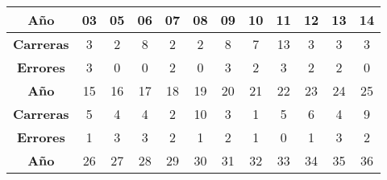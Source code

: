 \begin{table}[h!]
    \centering
    \begin{tabular}{cccccccccccc}
        \hline
        \multicolumn{1}{|c|}{\textbf{Año}} & \multicolumn{1}{c|}{03} & \multicolumn{1}{c|}{05} & \multicolumn{1}{c|}{06} & \multicolumn{1}{c|}{07} & \multicolumn{1}{c|}{08} & \multicolumn{1}{c|}{09} & \multicolumn{1}{c|}{10} & \multicolumn{1}{c|}{11} & \multicolumn{1}{c|}{12} & \multicolumn{1}{c|}{13} & \multicolumn{1}{c|}{14} \\ \hline
        \textbf{Carreras}                  & 3                       & 2                       & 8                       & 2                       & 2                       & 8                       & 7                       & 13                      & 3                       & 3                       & 3                       \\
        \textbf{Errores}                   & 3                       & 0                       & 0                       & 2                       & 0                       & 3                       & 2                       & 3                       & 2                       & 2                       & 0                       \\ \hline
        \multicolumn{1}{|c|}{\textbf{Año}} & \multicolumn{1}{c|}{15} & \multicolumn{1}{c|}{16} & \multicolumn{1}{c|}{17} & \multicolumn{1}{c|}{18} & \multicolumn{1}{c|}{19} & \multicolumn{1}{c|}{20} & \multicolumn{1}{c|}{21} & \multicolumn{1}{c|}{22} & \multicolumn{1}{c|}{23} & \multicolumn{1}{c|}{24} & \multicolumn{1}{c|}{25} \\ \hline
        \textbf{Carreras}                  & 5                       & 4                       & 4                       & 2                       & 10                      & 3                       & 1                       & 5                       & 6                       & 4                       & 9                       \\
        \textbf{Errores}                   & 1                       & 3                       & 3                       & 2                       & 1                       & 2                       & 1                       & 0                       & 1                       & 3                       & 2                       \\ \hline
        \multicolumn{1}{|c|}{\textbf{Año}} & \multicolumn{1}{c|}{26} & \multicolumn{1}{c|}{27} & \multicolumn{1}{c|}{28} & \multicolumn{1}{c|}{29} & \multicolumn{1}{c|}{30} & \multicolumn{1}{c|}{31} & \multicolumn{1}{c|}{32} & \multicolumn{1}{c|}{33} & \multicolumn{1}{c|}{34} & \multicolumn{1}{c|}{35} & \multicolumn{1}{c|}{36} \\ \hline

\end{tabular}
\end{table}
